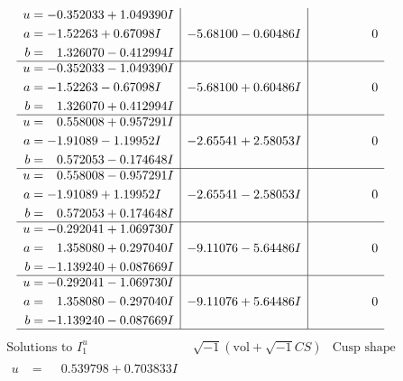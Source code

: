 \documentclass[1p]{elsarticle_modified}
\theoremstyle{definition}
\newcommand{\I}{\sqrt{-1}}
\begin{document}
$$\begin{array}{c|c|c}
\begin{aligned}
u &= -0.352033 + 1.049390 I \\
a &= -1.52263 + 0.67098 I \\
b &= \phantom{-}1.326070 - 0.412994 I\end{aligned}
 & -5.68100 - 0.60486 I & \phantom{-0.000000 } 0 \\ \hline\begin{aligned}
u &= -0.352033 - 1.049390 I \\
a &= -1.52263 - 0.67098 I \\
b &= \phantom{-}1.326070 + 0.412994 I\end{aligned}
 & -5.68100 + 0.60486 I & \phantom{-0.000000 } 0 \\ \hline\begin{aligned}
u &= \phantom{-}0.558008 + 0.957291 I \\
a &= -1.91089 - 1.19952 I \\
b &= \phantom{-}0.572053 - 0.174648 I\end{aligned}
 & -2.65541 + 2.58053 I & \phantom{-0.000000 } 0 \\ \hline\begin{aligned}
u &= \phantom{-}0.558008 - 0.957291 I \\
a &= -1.91089 + 1.19952 I \\
b &= \phantom{-}0.572053 + 0.174648 I\end{aligned}
 & -2.65541 - 2.58053 I & \phantom{-0.000000 } 0 \\ \hline\begin{aligned}
u &= -0.292041 + 1.069730 I \\
a &= \phantom{-}1.358080 + 0.297040 I \\
b &= -1.139240 + 0.087669 I\end{aligned}
 & -9.11076 - 5.64486 I & \phantom{-0.000000 } 0 \\ \hline\begin{aligned}
u &= -0.292041 - 1.069730 I \\
a &= \phantom{-}1.358080 - 0.297040 I \\
b &= -1.139240 - 0.087669 I\end{aligned}
 & -9.11076 + 5.64486 I & \phantom{-0.000000 } 0\\
 \hline 
 \end{array}$$\newpage$$\begin{array}{c|c|c}  
\text{Solutions to }I^u_{1}& \I (\text{vol} + \sqrt{-1}CS) & \text{Cusp shape}\\
 \hline 
\begin{aligned}
u &= \phantom{-}0.539798 + 0.703833 I \\

\end{aligned}
\end{array}$$
\end{document}
